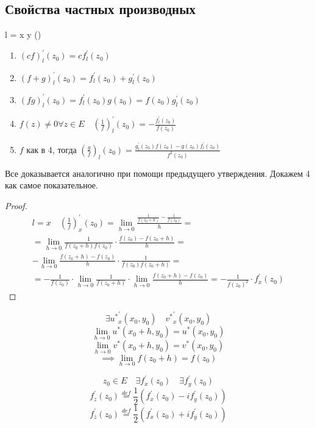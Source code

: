 \documentclass[main]{subfiles}
\begin{document}
\subsection{Свойства частных производных}
l = x  y ()
\begin{enumerate}
    \item $(cf)^\prime_l(z_0) = cf^\prime_l(z_0)$
    \item $(f+g)^\prime_l(z_0) = f^\prime_l(z_0) + g^\prime_l(z_0)$
    \item $(fg)^\prime_l(z_0) = f^\prime_l(z_0)g(z_0) = f(z_0)g^\prime_l(z_0)$
    \item $f(z) \ne 0 \forall z \in E \quad \left( \frac{1}{f} \right)^{\prime}_l (z_0) = - \frac{f^\prime_l(z_0)}{f(z_0)}$
    \item $f$ как в 4, тогда $\left(\frac{g}{f}\right)_l(z_0) = \frac{g^\prime_l(z_0)f(z_0)-g(z_0)f^\prime_l(z_0)}{f^2(z_0)}$
\end{enumerate}

Все доказывается аналогично при помощи предыдущего утверждения. Докажем 4 как самое показательное.
\begin{proof}
    \begin{multline*}
        l = x \quad \left(\frac{1}{f}\right)^\prime_x(z_0) = \underset{h \to 0}{\lim} \frac{\frac{1}{f(z_0+h)} - \frac{1}{f(z_0)}}{h} = \\
        = \underset{h \to 0}{\lim} \frac{1}{f(z_0+h)f(z_0)} \cdot \frac{f(z_0) - f(z_0+h)}{h} = \\
         -\underset{h \to 0}{\lim} \frac{f(z_0+h)-f(z_0)}{h} \cdot \frac{1}{f(z_0)f(z_0+h)} = \\
        = -\frac{1}{f(z_0)} \cdot \underset{h \to 0}{\lim} \frac{1}{f(z_0+h)} \cdot \underset{h \to 0}{\lim} \frac{f(z_0+h)-f(z_0)}{h} = - \frac{1}{f(z_0)^2} \cdot f^\prime_x(z_0)
    \end{multline*}
\end{proof}

\[ \exists {u^*}^\prime_x(x_0,y_0) \quad {v^*}^\prime_x(x_0,y_0) \] 
\[\underset{h \to 0}{\lim} u^*(x_0 + h, y_0) = u^*(x_0,y_0) \] 
\[ \underset{h \to 0}{\lim} v^*(x_0 + h, y_0) = v^*(x_0, y_0) \] 
\[ \implies \underset{h \to 0}{\lim} f(z_0 + h) = f(z_0) \]

\begin{theorem}
    \[ z_0 \in E \quad \exists f^\prime_x(z_0) \quad \exists f^\prime_y(z_0) \] 
    \[f^\prime_z (z_0) \stackrel{def}{=} \frac{1}{2} (f^\prime_x(z_0)-if^\prime_y(z_0)) \tag{12} \] 
    \[ f^\prime_{\overline{z}} (z_0) \stackrel{def}{=} \frac{1}{2} ( f^\prime_x(z_0) + if^\prime_y(z_0)) \tag{13} \]
\end{theorem}
\end{document}
